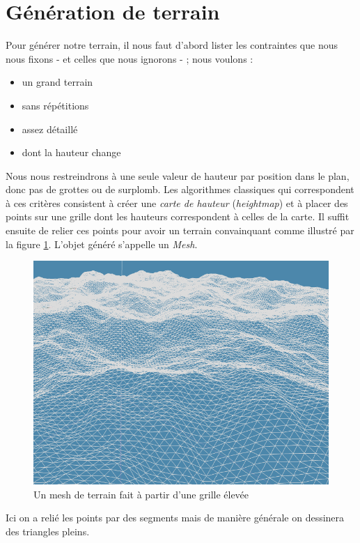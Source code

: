 \documentclass[11pt]{article} %
\begin{document}
\section{Génération de terrain}

Pour générer notre terrain, il nous faut d'abord lister les contraintes que nous nous fixons - et celles que nous ignorons - ; nous voulons :
\begin{itemize}
	\item{un grand terrain}
	\item{sans répétitions}
	\item{assez détaillé}
	\item{dont la hauteur change}
\end{itemize}

Nous nous restreindrons à une seule valeur de hauteur par position dans le plan, donc pas de grottes ou de surplomb. Les algorithmes classiques qui correspondent à ces critères consistent à créer une \textit{carte de hauteur} (\textit{heightmap}) et à placer des points sur une grille dont les hauteurs correspondent à celles de la carte. Il suffit ensuite de relier ces points pour avoir un terrain convainquant comme illustré par la figure \ref{fig:wireframe_terrain}. L'objet généré s'appelle un \textit{Mesh}.

\begin{figure}[h]
	\centering
	\includegraphics[scale=.49]{terrain_wireframe}
	\caption{Un mesh de terrain fait à partir d'une grille élevée}
	\label{fig:wireframe_terrain}
\end{figure}

Ici on a relié les points par des segments mais de manière générale on dessinera des triangles pleins.
\end{document}
